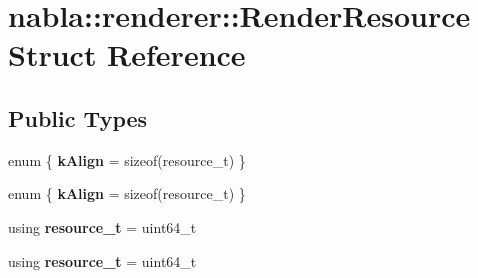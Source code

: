 \hypertarget{structnabla_1_1renderer_1_1_render_resource}{}\section{nabla\+::renderer\+::Render\+Resource Struct Reference}
\label{structnabla_1_1renderer_1_1_render_resource}
\subsection*{Public Types}
\begin{DoxyCompactItemize}
\item 
\mbox{\label{structnabla_1_1renderer_1_1_render_resource_aa86c2403353449f1169c2a752fdacdb5}} 
enum \{ {\bfseries k\+Align} = sizeof(resource\+\_\+t)
 \}
\item 
\mbox{\label{structnabla_1_1renderer_1_1_render_resource_a9d9b6cf5013e00019db0a159534f7698}} 
enum \{ {\bfseries k\+Align} = sizeof(resource\+\_\+t)
 \}
\item 
\mbox{\label{structnabla_1_1renderer_1_1_render_resource_a1d690df5fc3d6699ccd45839d2a17b79}} 
using {\bfseries resource\+\_\+t} = uint64\+\_\+t
\item 
\mbox{\label{structnabla_1_1renderer_1_1_render_resource_a1d690df5fc3d6699ccd45839d2a17b79}} 
using {\bfseries resource\+\_\+t} = uint64\+\_\+t
\end{DoxyCompactItemize}
